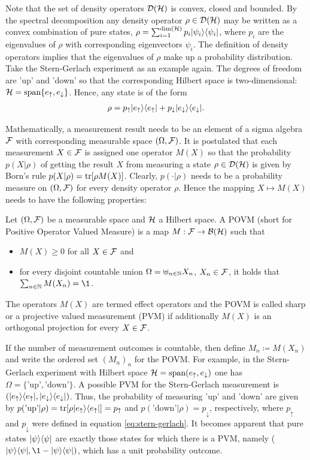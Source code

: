 Note that the set of density operators $\mathcal D(\mathcal{H})$ is convex, closed and bounded. By the spectral decomposition any density operator $\rho \in \mathcal D(\mathcal{H})$ may be written as a convex combination of pure states, $\rho=\sum_{i=1}^{\mathrm{dim}(\mathcal{H})}p_i \lvert\psi_i\rangle\langle\psi_i\rvert$, where $p_i$ are the eigenvalues of $\rho$ with corresponding eigenvectors $\psi_i$. The definition of density operators implies that the eigenvalues of $\rho$ make up a probability distribution. Take the Stern-Gerlach experiment as an example again. The degrees of freedom are 'up' and 'down' so that the corresponding Hilbert space is two-dimensional: $\mathcal{H} = \text{span}\{e_\uparrow,e_\downarrow\}$. Hence, any state is of the form 
\begin{align}\label{eq:stern-gerlach}
\rho = p_\uparrow \lvert e_\uparrow\rangle\langle e_\uparrow\rvert+p_\downarrow\lvert e_\downarrow\rangle\langle e_\downarrow\rvert.
\end{align}

Mathematically, a measurement result needs to be an element of a sigma algebra $\mathcal F$ with corresponding measurable space $(\Omega, \mathcal F)$. It is postulated that each measurement $X \in \mathcal F$ is assigned one operator $M(X)$ so that the probability $p(X|\rho)$ of getting the result $X$ from measuring a state $\rho \in \mathcal D(\mathcal{H})$ is given by Born's rule $p(X|\rho) = \mathrm{tr}[\rho M(X)]$. 
Clearly, $p(\cdot|\rho)$ needs to be a probability measure on $(\Omega, \mathcal F)$ for every density operator $\rho$. Hence the mapping $X \mapsto M(X)$ needs to have the following properties:
\begin{definition}[POVM]
    Let $(\Omega, \mathcal F)$ be a measurable space and $\mathcal{H}$ a Hilbert space. A POVM (short for Positive Operator Valued Measure) is a map $M:\mathcal F \rightarrow \mathcal B(\mathcal{H})$ such that
    \begin{itemize}
        \item[i)]$M(X)\geq 0$ for all $X \in \mathcal F$ and 
        \item[ii)] for every disjoint countable union $\Omega = \uplus_{n\in \mathbb{N}}X_n$, $X_n \in \mathcal F$, it holds that $\sum_{n\in \N}M(X_n) = \1$.
    \end{itemize}
    The operators $M(X)$ are termed effect operators and the POVM is called sharp or a projective valued measurement (PVM) if additionally $M(X)$ is an orthogonal projection for every $X \in \mathcal F$.{}
\end{definition}
If the number of measurement outcomes is countable, then define $M_n\coloneqq M(X_n)$ and write the ordered set $(M_n)_n$ for the POVM. For example, in the Stern-Gerlach experiment with Hilbert space $\mathcal{H} = \text{span}(e_\uparrow,e_\downarrow)$ one has $\Omega = \{\text{'up'},\text{'down'}\}$. A possible PVM for the Stern-Gerlach measurement is $(\lvert e_\uparrow\rangle\langle e_\uparrow\rvert, \lvert e_\downarrow\rangle\langle e_\downarrow\rvert)$. Thus, the probability of measuring 'up' and 'down' are given by $p(\text{'up'}|\rho) = \mathrm{tr}[\rho \lvert e_\uparrow\rangle\langle e_\uparrow\rvert]=p_\uparrow$ and  $p(\text{'down'}|\rho) =p_\downarrow$, respectively, where $p_\uparrow$ and $p_\downarrow$ were defined in equation \eqref{eq:stern-gerlach}. It becomes apparent that pure states $\lvert\psi\rangle\langle\psi\rvert$ are exactly those states for which there is a PVM, namely ($\pr \psi, \1 - \pr \psi)$, which has a unit probability outcome.

